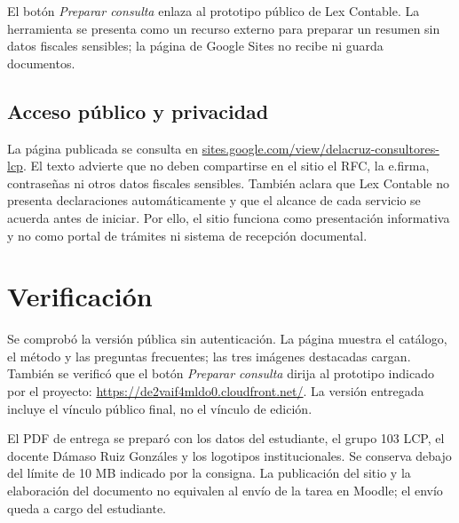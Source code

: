 {El botón \emph{Preparar consulta} enlaza al prototipo público de Lex Contable. La herramienta se presenta como un recurso externo para preparar un resumen sin datos fiscales sensibles; la página de Google Sites no recibe ni guarda documentos.

\subsection{Acceso público y privacidad}
La página publicada se consulta en \href{https://sites.google.com/view/delacruz-consultores-lcp}{sites.google.com/view/delacruz-consultores-lcp}. El texto advierte que no deben compartirse en el sitio el RFC, la e.firma, contraseñas ni otros datos fiscales sensibles. También aclara que Lex Contable no presenta declaraciones automáticamente y que el alcance de cada servicio se acuerda antes de iniciar. Por ello, el sitio funciona como presentación informativa y no como portal de trámites ni sistema de recepción documental.

\section{Verificación}
Se comprobó la versión pública sin autenticación. La página muestra el catálogo, el método y las preguntas frecuentes; las tres imágenes destacadas cargan. También se verificó que el botón \emph{Preparar consulta} dirija al prototipo indicado por el proyecto: \url{https://de2vaif4mldo0.cloudfront.net/}. La versión entregada incluye el vínculo público final, no el vínculo de edición.

El PDF de entrega se preparó con los datos del estudiante, el grupo 103 LCP, el docente Dámaso Ruiz Gonzáles y los logotipos institucionales. Se conserva debajo del límite de 10 MB indicado por la consigna. La publicación del sitio y la elaboración del documento no equivalen al envío de la tarea en Moodle; el envío queda a cargo del estudiante.
}

\def\actividadcierre{%
\section{Conclusiones}
Google Sites permitió organizar una presentación pública del servicio sin incrustar el prototipo ni simular funciones que la página no ofrece. La estructura hace visibles la oferta, el proceso de trabajo y las precauciones de privacidad; el vínculo al prototipo conserva una separación clara entre información comercial y herramienta externa. La revisión pública confirmó que el sitio es accesible y que sus imágenes y enlaces principales están disponibles. El contenido evita prometer resultados fiscales y establece que la revisión y autorización de cada trámite corresponden a las personas responsables.
}


